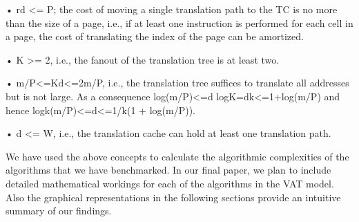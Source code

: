 •  rd <= P; the cost of moving a single translation path to the TC is no more than the size of a page, i.e., if at least one instruction is performed for each cell in a page, the cost of translating the index of the page can be amortized.

•	K >= 2, i.e., the fanout of the translation tree is at least two.

•	m/P<=Kd<=2m/P, i.e., the translation tree suffices to translate all addresses but is not large. As a consequence log(m/P)<=d logK=dk<=1+log(m/P) and hence logk(m/P)<=d<=1/k(1 + log(m/P)).

•	d <= W, i.e., the translation cache can hold at least one translation path.

We have used the above concepts to calculate the algorithmic complexities of the algorithms that we have benchmarked. In our final paper, we plan to include detailed mathematical workings for each of the algorithms in the VAT model. Also the graphical representations in the following sections provide an intuitive summary of our findings.

